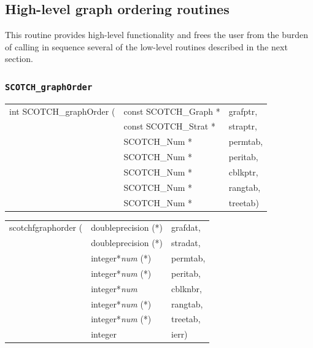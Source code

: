 \subsection{High-level graph ordering routines}

This routine provides high-level functionality and frees the
user from the burden of calling in sequence several of the low-level
routines described in the next section.

\subsubsection{{\tt SCOTCH\_graphOrder}}

\begin{itemize}
\progsyn

{\tt\begin{tabular}{l@{}ll}
int SCOTCH\_graphOrder ( & const SCOTCH\_Graph * & grafptr, \\
                         & const SCOTCH\_Strat * & straptr, \\
                         & SCOTCH\_Num *         & permtab, \\
                         & SCOTCH\_Num *         & peritab, \\
                         & SCOTCH\_Num *         & cblkptr, \\
                         & SCOTCH\_Num *         & rangtab, \\
                         & SCOTCH\_Num *         & treetab)
\end{tabular}}

{\tt\begin{tabular}{l@{}ll}
scotchfgraphorder ( & doubleprecision (*)   & grafdat, \\
                    & doubleprecision (*)   & stradat, \\
                    & integer*{\it num} (*) & permtab, \\
                    & integer*{\it num} (*) & peritab, \\
                    & integer*{\it num}     & cblknbr, \\
                    & integer*{\it num} (*) & rangtab, \\
                    & integer*{\it num} (*) & treetab, \\
                    & integer               & ierr)
\end{tabular}}

\progdes


\end{itemize}
